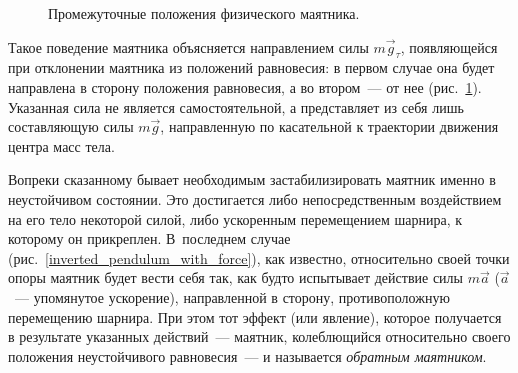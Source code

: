 \documentclass[12pt,a4paper,openany]{extarticle}
\begin{document}
\begin{figure}[h]
	\begin{minipage}[h]{0.49\linewidth}
	\end{minipage}
	\hfill
	\begin{minipage}[h]{0.49\linewidth}
	\end{minipage}
	\caption{Промежуточные положения физического маятника.}
	\label{pendulum_with_angle}
\end{figure}

Такое поведение маятника объясняется направлением силы $m\vec g_\tau$, появляющейся при отклонении маятника из положений равновесия: в первом случае она будет направлена в сторону положения равновесия, а во втором~--- от нее (рис.~\ref{pendulum_with_angle}).
Указанная сила не является самостоятельной, а представляет из себя лишь составляющую силы $m\vec g$, направленную по касательной к траектории движения центра масс тела.

Вопреки сказанному бывает необходимым застабилизировать маятник именно в неустойчивом состоянии.
Это достигается либо непосредственным воздействием на его тело некоторой силой, либо ускоренным перемещением шарнира, к которому он прикреплен.
В~последнем случае (рис.~\ref{inverted_pendulum_with_force}), как известно, относительно своей точки опоры маятник будет вести себя так, как будто испытывает действие силы $m\vec a$ ($\vec a$~--- упомянутое ускорение), направленной в сторону, противоположную перемещению шарнира. При этом тот эффект (или явление), которое получается в результате указанных действий~--- маятник, колеблющийся относительно своего положения неустойчивого равновесия~--- и называется \textit{обратным маятником}.
\end{document}

